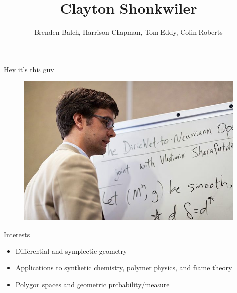 \documentclass[usenames,dvipsnames]{beamer}
\title{Clayton Shonkwiler}
\subtitle{Brenden Balch, Harrison Chapman, Tom Eddy, Colin Roberts}
\theoremstyle{definition}
\theoremstyle{theorem}
\begin{document}
{
\begin{frame}
\titlepage
\end{frame}
}


    
    \begin{frame}{Hey it's this guy}
        \begin{figure}
            \centering
            \includegraphics[width=.8\textwidth]{Recruitment_Day/clay.jpg}
        \end{figure}
    \end{frame}
    
    
    \begin{frame}{Interests}
        \begin{itemize}
            \item Differential and symplectic geometry
            \item Applications to synthetic chemistry, polymer physics, and frame theory
            \item Polygon spaces and geometric probability/measure
        \end{itemize}
    \end{frame}
\end{document}
